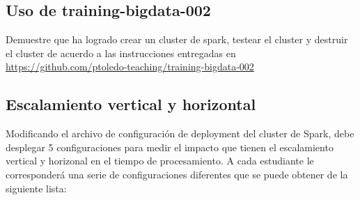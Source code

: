 \documentclass[12pt,letterpaper,twoside]{article}
\begin{document}
\subsection{Uso de training-bigdata-002}

{\color{red} Demuestre que ha logrado crear un cluster de spark, testear el cluster y destruir el cluster de acuerdo a las instrucciones entregadas en \url{https://github.com/ptoledo-teaching/training-bigdata-002}}

\subsection{Escalamiento vertical y horizontal}

{\color{red} Modificando el archivo de configuración de deployment del cluster de Spark, debe desplegar 5 configuraciones para medir el impacto que tienen el escalamiento vertical y horizonal en el tiempo de procesamiento. A cada estudiante le corresponderá una serie de configuraciones diferentes que se puede obtener de la siguiente lista:

}
\end{document}
